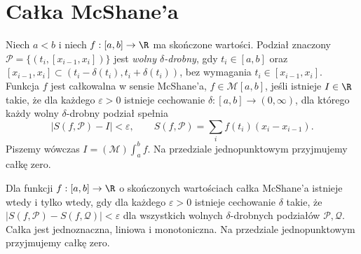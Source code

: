 \section{Całka McShane'a}
\providecommand{\atlasref}[2]{#2}
\begin{definicja}\label{it:def:mcshane}
Niech $a<b$ i niech $f:[a,b]\to\R$ ma skończone wartości. Podział znaczony $\mathcal P=\{(t_i,[x_{i-1},x_i])\}$ jest \emph{wolny $\delta$-drobny}, gdy $t_i\in[a,b]$ oraz $[x_{i-1},x_i]\subset(t_i-\delta(t_i),t_i+\delta(t_i))$, bez wymagania $t_i\in[x_{i-1},x_i]$. Funkcja $f$ jest całkowalna w sensie McShane'a, $f\in\mathcal M[a,b]$, jeśli istnieje $I\in\R$ takie, że dla każdego $\varepsilon>0$ istnieje cechowanie $\delta:[a,b]\to(0,\infty)$, dla którego każdy wolny $\delta$-drobny podział spełnia
\[
\left|S(f,\mathcal P)-I\right|<\varepsilon,\qquad
 S(f,\mathcal P)=\sum_i f(t_i)(x_i-x_{i-1}).
\]
Piszemy wówczas $I=(\mathcal M)\int_a^b f$. Na przedziale jednopunktowym przyjmujemy całkę zero.
\end{definicja}
\begin{twierdzenie}\label{it:thm:mcshane-basic}
Dla funkcji $f:[a,b]\to\R$ o skończonych wartościach
całka McShane'a istnieje wtedy i tylko wtedy, gdy dla każdego
$\varepsilon>0$ istnieje cechowanie $\delta$ takie, że
$|S(f,\mathcal P)-S(f,\mathcal Q)|<\varepsilon$ dla wszystkich
wolnych $\delta$-drobnych podziałów $\mathcal P,\mathcal Q$.
Całka jest jednoznaczna, liniowa i monotoniczna.
Na przedziale jednopunktowym przyjmujemy całkę zero.
\end{twierdzenie}
